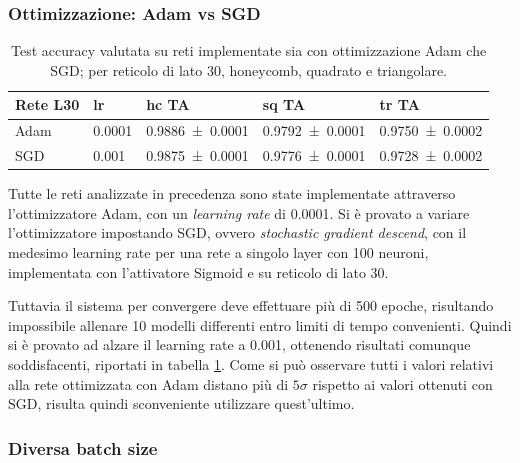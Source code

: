 \documentclass{article}
\begin{document}
\subsubsection{Ottimizzazione: Adam vs SGD}

\begin{table}[ht]
\begin{center}
\begin{tabular}{lllll}
\toprule
Rete L30& lr & hc TA & sq TA & tr TA \\
\midrule
Adam &0.0001& \num{0.9886\pm 0.0001} & \num{0.9792\pm 0.0001} & \num{0.9750\pm 0.0002}\\
SGD & 0.001 & \num{0.9875\pm 0.0001} & \num{0.9776 \pm 0.0001} &\num{ 0.9728\pm 0.0002}\\
\bottomrule
\end{tabular}
\end{center}
\caption{Test accuracy valutata su reti implementate sia con ottimizzazione Adam che SGD; per reticolo di lato 30, honeycomb, quadrato e triangolare.}
\label{tab:adaVSsgd}
\end{table}

Tutte le reti analizzate in precedenza sono state implementate attraverso l'ottimizzatore Adam, con un \emph{learning rate} di 0.0001.
Si è provato a variare l'ottimizzatore impostando SGD, ovvero \emph{stochastic gradient descend}, con il medesimo learning rate per una rete a singolo layer con 100 neuroni, implementata con l'attivatore Sigmoid e su reticolo di lato 30.

Tuttavia il sistema per convergere deve effettuare più di 500 epoche, risultando impossibile allenare 10 modelli differenti entro limiti di tempo convenienti.
Quindi si è provato ad alzare il learning rate a 0.001, ottenendo risultati comunque soddisfacenti, riportati in tabella \ref{tab:adaVSsgd}.
Come si può osservare tutti i valori relativi alla rete ottimizzata con Adam distano più di $5\sigma$ rispetto ai valori ottenuti con SGD, risulta quindi sconveniente utilizzare quest'ultimo.

\subsubsection{Diversa batch size}
\end{document}
